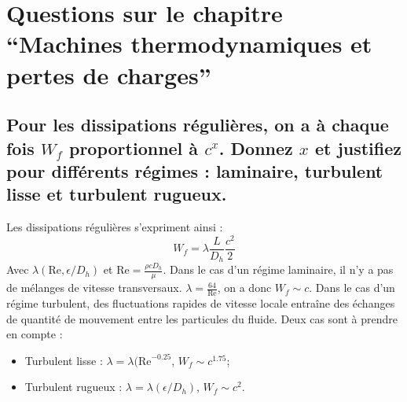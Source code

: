 \section{Questions sur le chapitre ``Machines thermodynamiques et pertes de charges''}
\subsection{Pour les dissipations régulières, on a à chaque fois $W_f$ proportionnel à $c^x$. Donnez $x$ et justifiez pour différents régimes : laminaire, turbulent lisse et turbulent rugueux.}
Les dissipations régulières s'expriment ainsi :
\begin{equation} W_f = \lambda\frac{L}{D_h}\frac{c^2}{2} \end{equation}
Avec $\lambda(\text{Re}, \epsilon/D_h)$ et $\text{Re} = \frac{\rho cD_h}{\mu}$.
Dans le cas d'un régime laminaire, il n'y a pas de mélanges de vitesse transversaux. $\lambda = \frac{64}{\text{Re}}$, on a donc $W_f \sim c$. Dans le cas d'un régime turbulent, des fluctuations rapides de vitesse locale entraîne des échanges de quantité de mouvement entre les particules du fluide. Deux cas sont à prendre en compte :
\begin{itemize}
	\item Turbulent lisse : $\lambda = \lambda(\text{Re}^{-0.25}$, $W_f \sim c^{1.75}$;
	\item Turbulent rugueux : $\lambda = \lambda(\epsilon/D_h)$, $W_f \sim c^2$.
\end{itemize}
